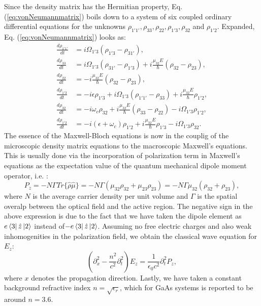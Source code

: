 \documentclass[10pt,letterpaper]{article}
\begin{document}
Since the density matrix has the Hermitian property, Eq. (\ref{eq:vonNeumannmatrix}) boils down to a system of six coupled ordinary differential equations for the unknowns $\rho_{1'1'}, \rho_{33},\rho_{22},\rho_{1'3},\rho_{32} $ and $\rho_{1'2}$. Expanded, Eq. (\ref{eq:vonNeumannmatrix}) looks as:
\begin{align}
\frac{d \rho_{1'1'}}{d t} &= i\Omega_{1'3} (\rho_{1'3} - \rho_{31'}), \nonumber\\ 
\frac{d \rho_{33}}{d t}   &= i\Omega_{1'3} (\rho_{31'} - \rho_{1'3}) + i\frac{\mu_{32} E}{\hbar} (\rho_{32}-\rho_{23}),  \nonumber\\
\frac{d \rho_{22}}{d t}   &=- i\frac{\mu_{32} E}{\hbar} (\rho_{32}-\rho_{23}) , \nonumber\\
\frac{d \rho_{1'3}}{d t}  &= -i\epsilon\rho_{1'3} +i \Omega_{1'3}(\rho_{1'1'} - \rho_{33}) +i\frac{\mu_{32}E}{\hbar}\rho_{1'2}, \nonumber\\
\frac{d \rho_{32}}{d t}   &= -i\omega_{c}\rho_{32} +i \frac{\mu_{32}E}{\hbar}(\rho_{33}-\rho_{22}) -i\Omega_{1'3}\rho_{1'2} , \nonumber  \\
\frac{d \rho_{1'2}}{d t}  &= -i(\epsilon+\omega_c)\rho_{1'2} +i\frac{\mu_{32}E}{\hbar}\rho_{1'3} -i\Omega_{1'3}\rho_{32} . \label{eq:vonNeumannexpanded}
\end{align}
The essence of the Maxwell-Bloch equations is now in the couplig of the microscopic density matrix equations to the macroscopic Maxwell's equations. This is usually done via the incorporation of  polarization term in Maxwell's equations as the expectation value of the quantum mechanical dipole moment operator, i.e. :
\begin{equation} 
P_z = -N\Gamma Tr\{\hat\rho \hat\mu\} = -N\Gamma(\mu_{32}\rho_{32} + \mu_{23}\rho_{23}) =  -N\Gamma\mu_{32}(\rho_{32}+\rho_{23}) ,
\end{equation}
where $N$ is the average carrier density per unit volume and $\Gamma$ is the spatial overalp between the optical field  and the active region. The negative sign in the above expression is due to the fact that we have taken the dipole element as $e \Bra{3}\hat{z} \Ket{2}$ instead of$-e \Bra{3}\hat{z} \Ket{2}$. Assuming no free electric charges and also weak inhomogenities in the polarization field, we obtain the classical wave equation for  $E_z$:
\begin{equation}
(\partial^2_{x} -\frac{n^2}{c^2}\partial^2_t) E_z = \frac{1}{\epsilon_0 c^2}\partial^2_t P_z, 
\label{eq:fullwave}
\end{equation}
where $x$ denotes the propagation direction. Lastly, we have taken a constant background refractive index $n=\sqrt{\epsilon_r}$, which for GaAs systems is reported to be around $n = 3.6$.
\end{document}
